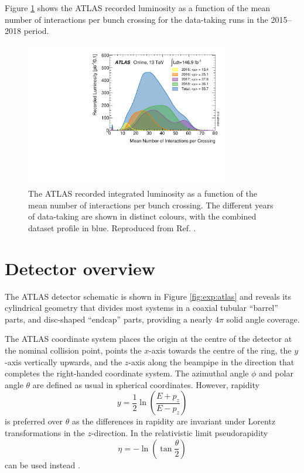 Figure \ref{fig:exp:pileup} shows the ATLAS recorded luminosity as a
function of the mean number of interactions per bunch crossing for
the data-taking runs in the 2015--2018 period.

\begin{figure}[h]
  \centering
  \includegraphics[width=0.8\textwidth]{figures/experiment/pileup}
  \caption[Mean number of interactions per bunch crossing]{The ATLAS recorded
  integrated luminosity as a function of the mean number
  of interactions per bunch crossing. The different years of data-taking
  are shown in distinct colours, with the combined dataset profile in blue.
  Reproduced from Ref. \cite{pileup}.}
  \label{fig:exp:pileup}
\end{figure}

\section{Detector overview}

The ATLAS detector schematic is shown in Figure \ref{fig:exp:atlas} and
reveals its cylindrical geometry that divides most systems in a coaxial 
tubular ``barrel'' parts, and disc-shaped ``endcap'' parts, providing
a nearly $4\pi$ solid angle coverage.

The ATLAS coordinate system places
the origin at the centre of the detector at the nominal collision point,
points the $x$-axis towards the centre of the ring, the $y$-axis vertically
upwards, and the $z$-axis along the beampipe in the direction that
completes the right-handed coordinate system. The azimuthal angle $\phi$
and polar angle $\theta$ are defined as usual in spherical coordinates.
However, rapidity
\begin{equation}
y = \frac{1}{2}\ln{\left( \frac{E+p_z}{E-p_z}\right)}
\end{equation}
is preferred over $\theta$ as the differences in rapidity are invariant
under Lorentz transformations in the $z$-direction. In the relativistic
limit pseudorapidity
\begin{equation}
\eta = - \ln{\left(\tan{\frac{\theta}{2}}\right)}
\end{equation}
can be used instead \cite{Thomson:2013zua}.

